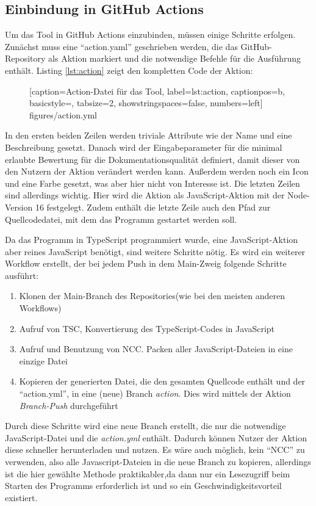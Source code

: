 \subsection{Einbindung in GitHub Actions}\label{chapter:github_actions_impl}
Um das Tool in GitHub Actions einzubinden, müssen einige Schritte erfolgen. Zunächst muss eine \enquote{action.yaml} geschrieben werden, die das GitHub-Repository als Aktion markiert und die notwendige Befehle für die Ausführung enthält. Listing  \ref{lst:action} zeigt den kompletten Code der Aktion:
\begin{figure} [htbp]

[caption={Action-Datei für das Tool},
label={lst:action},
captionpos=b, basicstyle=\footnotesize, tabsize=2, showstringspaces=false,  numbers=left]
{figures/action.yml}
\end{figure}

In den ersten beiden Zeilen werden triviale Attribute wie der Name und eine Beschreibung gesetzt. Danach wird der Eingabeparameter für die minimal erlaubte Bewertung für die Dokumentationsqualität definiert, damit dieser von den Nutzern der Aktion verändert werden kann.  Außerdem werden noch ein Icon und eine Farbe gesetzt, was aber hier nicht von Interesse ist. Die letzten Zeilen sind allerdings wichtig. Hier wird die Aktion als JavaScript-Aktion mit der Node-Version 16 festgelegt. Zudem enthält die letzte Zeile auch den Pfad zur Quellcodedatei, mit dem das Programm gestartet werden soll. 

Da das Programm in TypeScript programmiert wurde, eine JavaScript-Aktion aber reines JavaScript benötigt, sind weitere Schritte nötig. Es wird ein weiterer Workflow erstellt, der bei jedem Push in dem Main-Zweig folgende Schritte ausführt:
\begin{enumerate}
    \item Klonen der Main-Branch des Repositories(wie bei den meisten anderen Workflows)
    \item Aufruf von TSC, Konvertierung des TypeScript-Codes in JavaScript
    \item Aufruf und Benutzung von NCC\cite{ncc}. Packen aller JavaScript-Dateien in eine einzige Datei
    \item Kopieren der generierten Datei, die den gesamten Quellcode enthält und der \enquote{action.yml}, in eine (neue) Branch \textit{action}. Dies wird mittels der Aktion \textit{Branch-Push}\cite{Branch-Push} durchgeführt
\end{enumerate}
Durch diese Schritte wird eine neue Branch erstellt, die nur die notwendige JavaScript-Datei und die \textit{action.yml} enthält. Dadurch können Nutzer der Aktion diese schneller herunterladen und nutzen. Es wäre auch möglich, kein \enquote{NCC} zu verwenden, also alle Javascript-Dateien in die neue Branch zu kopieren, allerdings ist die hier gewählte Methode praktikabler,da dann nur ein Lesezugriff beim Starten des Programms erforderlich ist und so ein Geschwindigkeitsvorteil existiert. 

